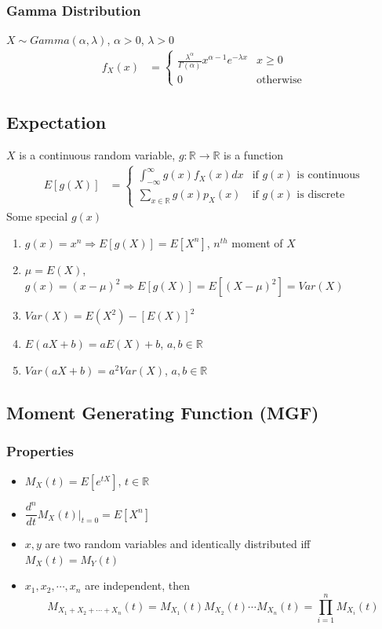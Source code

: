 \documentclass[11pt]{article}
\newcommand{\R}{{\mathbb{R}}}
\newcommand{\ds}{\displaystyle}
\begin{document}
\subsubsection*{Gamma Distribution}
$X\sim Gamma(\alpha,\lambda)$, $\alpha>0$, $\lambda>0$
\begin{align*}
    f_X(x) &= \begin{cases}
        \ds\frac{\lambda^{\alpha}}{\Gamma(\alpha)}x^{\alpha-1}e^{-\lambda x} & x\geq 0 \\
        0 & \text{otherwise}
    \end{cases}
\end{align*}
\subsection{Expectation}
$X$ is a continuous random variable, $g:\R\to\R$ is a function 
\begin{align*}
    E[g(X)] &= \begin{cases}
        \ds\int_{-\infty}^{\infty}g(x)f_X(x)dx & \text{if } g(x) \text{ is continuous} \\
        \ds\sum_{x\in\R}g(x)p_X(x) & \text{if } g(x) \text{ is discrete}
    \end{cases}
\end{align*}
Some special $g(x)$
\begin{enumerate}
    \item $g(x)=x^n\Rightarrow E[g(X)] = E[X^n]$, $n^{th}$ moment of $X$ 
    \item $\mu=E(X)$, $g(x)=(x-\mu)^2\Rightarrow E[g(X)]=E[(X-\mu)^2]=Var(X)$
    \item $Var(X)=E(X^2)-[E(X)]^2$ 
    \item $E(aX+b)=aE(X)+b$, $a,b\in\R$
    \item $Var(aX+b)=a^2Var(X)$, $a,b\in\R$
\end{enumerate}
\subsection{Moment Generating Function (MGF)}
\subsubsection*{Properties}
\begin{itemize}
    \item $M_X(t)=E[e^{tX}]$, $t\in\R$
    \item $\dfrac{d^n}{dt}M_X(t)\bigg|_{t=0}=E[X^n]$ 
    \item $x,y$ are two random variables and identically distributed iff $M_X(t)=M_Y(t)$
    \item $x_1,x_2,\cdots,x_n$ are independent, then \[M_{X_1+X_2+\cdots+X_n}(t)=M_{X_1}(t)M_{X_2}(t)\cdots M_{X_n}(t) = \prod_{i=1}^{n}M_{X_i}(t)\]
\end{itemize}
\end{document}
